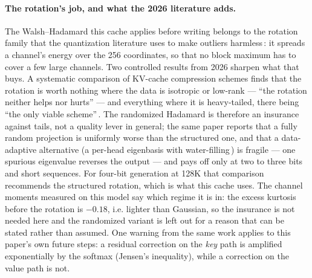 \documentclass[10pt,twocolumn]{article}
\begin{document}
\paragraph{The rotation's job, and what the 2026 literature adds.} The Walsh--Hadamard this cache applies before writing belongs to the rotation family that the quantization literature uses to make outliers harmless\,\cite{quarot,rotatekv}: it spreads a channel's energy over the 256 coordinates, so that no block maximum has to cover a few large channels. Two controlled results from 2026 sharpen what that buys. A systematic comparison of KV-cache compression schemes finds that the rotation is worth nothing where the data is isotropic or low-rank --- ``the rotation neither helps nor hurts'' --- and everything where it is heavy-tailed, there being ``the only viable scheme''\,\cite{amd-kv-ablation}. The randomized Hadamard is therefore an insurance against tails, not a quality lever in general; the same paper reports that a fully random projection is uniformly worse than the structured one, and that a data-adaptive alternative (a per-head eigenbasis with water-filling\,\cite{spectralquant}) is fragile --- one spurious eigenvalue reverses the output --- and pays off only at two to three bits and short sequences. For four-bit generation at 128K that comparison recommends the structured rotation, which is what this cache uses. The channel moments measured on this model say which regime it is in: the excess kurtosis before the rotation is $-0.18$, i.e. lighter than Gaussian, so the insurance is not needed here and the randomized variant is left out for a reason that can be stated rather than assumed. One warning from the same work applies to this paper's own future steps: a residual correction on the \emph{key} path is amplified exponentially by the softmax (Jensen's inequality), while a correction on the value path is not.
\end{document}
